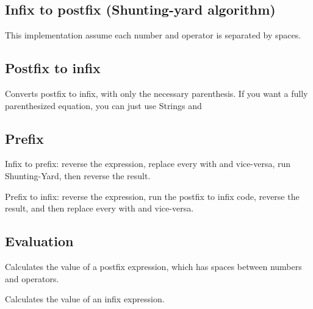 
\subsection*{Infix to postfix (Shunting-yard algorithm)}

This implementation assume each number and operator is separated by spaces.



\subsection*{Postfix to infix}

Converts postfix to infix, with only the necessary parenthesis. If you want a fully parenthesized equation, you can just use Strings and 



\subsection*{Prefix}

Infix to prefix: reverse the expression, replace every  with  and vice-versa, run Shunting-Yard, then reverse the result.

Prefix to infix: reverse the expression, run the postfix to infix code, reverse the result, and then replace every  with  and vice-versa.

\subsection*{Evaluation}

Calculates the value of a postfix expression, which has spaces between numbers and operators.



Calculates the value of an infix expression.



\newpage